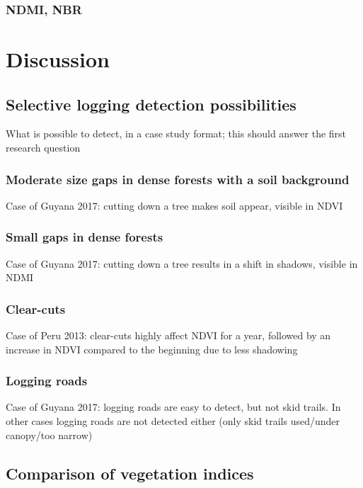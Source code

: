 \documentclass[a4paper,12pt]{scrbook}
\begin{document}
\subsection{NDMI, NBR}

\chapter{Discussion}

\section{Selective logging detection possibilities}

What is possible to detect, in a case study format; this should answer the first research question

\subsection{Moderate size gaps in dense forests with a soil background}

Case of Guyana 2017: cutting down a tree makes soil appear, visible in \ac{NDVI}

\subsection{Small gaps in dense forests}

Case of Guyana 2017: cutting down a tree results in a shift in shadows, visible in \ac{NDMI}

\subsection{Clear-cuts}

Case of Peru 2013: clear-cuts highly affect \ac{NDVI} for a year, followed by an increase in \ac{NDVI} compared to the beginning due to less shadowing

\subsection{Logging roads}

Case of Guyana 2017: logging roads are easy to detect, but not skid trails. In other cases logging roads are not detected either (only skid trails used/under canopy/too narrow)

\section{Comparison of vegetation indices}
\end{document}
